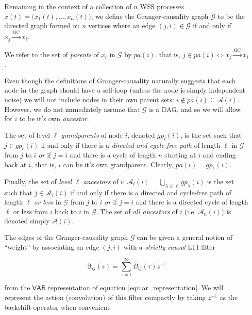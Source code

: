 \documentclass[12pt]{article}
\def\gc{\overset{\text{GC}}{\rightarrow}}  %
\def\gcg{\mathcal{G}}  %
\def\VAR{\mathsf{VAR}}  %
\def\B{\mathsf{B}}  %
\newcommand{\pa}[1]{pa(#1)}  %
\newcommand{\anc}[1]{\mathcal{A}(#1)}  %
\newcommand{\ancn}[2]{\mathcal{A}_{#1}(#2)}  %
\newcommand{\gpn}[2]{gp_{#1}(#2)}  %
\begin{document}
\begin{definition}

Remaining in the context of a collection of $n$ WSS processes
$x(t) = \big(x_1(t), \ldots, x_n(t)\big)$, we define the Granger-causality
graph $\gcg$ to be the directed graph formed on $n$ vertices where an
edge $(j, i) \in \gcg$ if and only if $x_j \gc x_i$.

We refer to the set of \textit{parents} of $x_i$ in $\gcg$ by
$\pa{i}$, that is, $j \in \pa{i} \iff x_j \gc x_i$.

Even though the definitions of Granger-causality naturally suggests
that each node in the graph should have a self-loop (unless the node
is simply independent noise) we will not include nodes in their own
parent sets: $i \not\in \pa{i} \subseteq \anc{i}$.  However, we do not
immediately assume that $\gcg$ is a DAG, and so we will allow for $i$
to be it's own \textit{ancestor}.

The set of level $\ell$ \textit{grandparents} of node $i$, denoted
$\gpn{\ell}{i}$, is the set such that $j \in \gpn{\ell}{i}$ if and only if
there is a \textit{directed and cycle-free path} of length $\ell$ in
$\gcg$ from $j$ to $i$ \textit{or} if $j = i$ and there is a cycle of
length $n$ starting at $i$ and ending back at $i$, that is, $i$ can be
it's own grandparent.  Clearly, $\pa{i} = \gpn{1}{i}$.

Finally, the set of \textit{level $\ell$ ancestors} of
$i$: $\ancn{\ell}{i} = \bigcup_{\lambda \le \ell}\gpn{\lambda}{i}$ is the set such that
$j \in \ancn{\ell}{i}$ if and only if there is a directed and cycle-free
path of length $\ell$ \textit{or less} in $\gcg$ from $j$ to $i$
\textit{or} if $j = i$ and there is a directed cycle of length $\ell$ or
less from $i$ back to $i$ in $\gcg$.  The set of \textit{all
  ancestors} of $i$ (i.e. $\ancn{n}{i}$) is denoted simply $\anc{i}$.
\end{definition}

The edges of the Granger-causality graph $\gcg$ can be given a general
notion of ``weight'' by associating an edge $(j, i)$ with a
\textit{strictly causal} LTI filter

\begin{equation}
  \label{eqn:filter}
  \B_{ij}(z) = \sum_{\tau = 1}^{\infty} B_{ij}(\tau)z^{-\tau}
\end{equation}

from the $\VAR$ representation of equation
\ref{eqn:ar_representation}.  We will represent the action
(convolution) of this filter compactly by taking $z^{-1}$ as the
backshift operator when convenient
\end{document}
